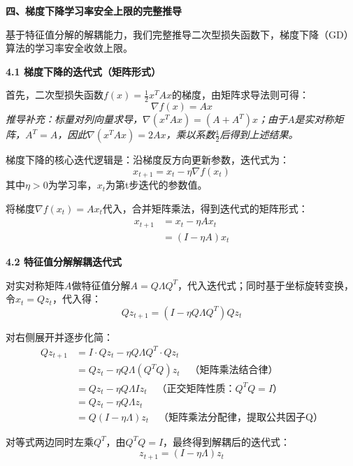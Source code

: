 \documentclass[10pt]{article}
\numberwithin{equation}{section}
\theoremstyle{plain}
\theoremstyle{definition}
\theoremstyle{remark}
\begin{document}
{\par\vspace{1ex}\noindent\large\bfseries\color{brandD} 四、梯度下降学习率安全上限的完整推导\par}\par\vspace{0.5ex}
基于特征值分解的解耦能力，我们完整推导二次型损失函数下，梯度下降（GD）算法的学习率安全收敛上限。

{\par\vspace{0.8ex}\noindent\normalsize\bfseries\color{secblue} 4.1 梯度下降的迭代式（矩阵形式）\par}
首先，二次型损失函数$f(x) = \frac{1}{2}x^T A x$的梯度，由矩阵求导法则可得：
\[ \nabla f(x) = A x \]
\textit{推导补充：标量对列向量求导，$\nabla (x^T A x) = (A + A^T)x$；由于$A$是实对称矩阵，$A^T=A$，因此$\nabla (x^T A x)=2Ax$，乘以系数$\frac{1}{2}$后得到上述结果。}

梯度下降的核心迭代逻辑是：沿梯度反方向更新参数，迭代式为：
\[ x_{t+1} = x_t - \eta \nabla f(x_t) \]
其中$\eta>0$为学习率，$x_t$为第t步迭代的参数值。

将梯度$\nabla f(x_t)=A x_t$代入，合并矩阵乘法，得到迭代式的矩阵形式：
\[
\begin{aligned}
x_{t+1} &= x_t - \eta A x_t \\
&= (I - \eta A) x_t
\end{aligned}
\]

{\par\vspace{0.8ex}\noindent\normalsize\bfseries\color{secblue} 4.2 特征值分解解耦迭代式\par}
对实对称矩阵$A$做特征值分解$A = Q \Lambda Q^T$，代入迭代式；同时基于坐标旋转变换，令$x_t = Q z_t$，代入得：
\[ Q z_{t+1} = (I - \eta Q \Lambda Q^T) Q z_t \]

对右侧展开并逐步化简：
\[
\begin{aligned}
Q z_{t+1} &= I \cdot Q z_t - \eta Q \Lambda Q^T \cdot Q z_t \\
&= Q z_t - \eta Q \Lambda (Q^T Q) z_t \quad \text{（矩阵乘法结合律）} \\
&= Q z_t - \eta Q \Lambda I z_t \quad \text{（正交矩阵性质：$Q^T Q = I$）} \\
&= Q z_t - \eta Q \Lambda z_t \\
&= Q (I - \eta \Lambda) z_t \quad \text{（矩阵乘法分配律，提取公共因子Q）}
\end{aligned}
\]

对等式两边同时左乘$Q^T$，由$Q^T Q = I$，最终得到解耦后的迭代式：
\[ z_{t+1} = (I - \eta \Lambda) z_t \]
\end{document}
